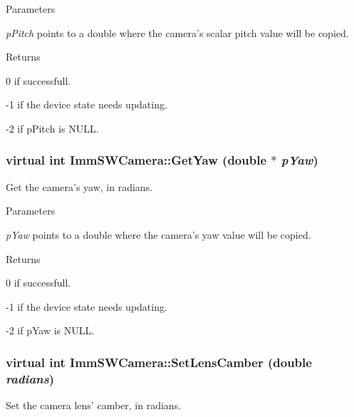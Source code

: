 \begin{DoxyParams}{Parameters}
\item[{\em pPitch}]points to a double where the camera's scalar pitch value will be copied.\end{DoxyParams}
\begin{DoxyReturn}{Returns}

\end{DoxyReturn}
0 if successfull.

-\/1 if the device state needs updating.

-\/2 if pPitch is NULL. \hypertarget{classImmSWCamera_aa6225ae94cf2f697a563a96cc66be588}{
\subsubsection[{GetYaw}]{\setlength{\rightskip}{0pt plus 5cm}virtual int ImmSWCamera::GetYaw (double $\ast$ {\em pYaw})}}
\label{classImmSWCamera_aa6225ae94cf2f697a563a96cc66be588}
Get the camera's yaw, in radians.


\begin{DoxyParams}{Parameters}
\item[{\em pYaw}]points to a double where the camera's yaw value will be copied.\end{DoxyParams}
\begin{DoxyReturn}{Returns}

\end{DoxyReturn}
0 if successfull.

-\/1 if the device state needs updating.

-\/2 if pYaw is NULL. \hypertarget{classImmSWCamera_a05587ccc045713d87234f0ea1395589a}{
\subsubsection[{SetLensCamber}]{\setlength{\rightskip}{0pt plus 5cm}virtual int ImmSWCamera::SetLensCamber (double {\em radians})}}
\label{classImmSWCamera_a05587ccc045713d87234f0ea1395589a}
Set the camera lens' camber, in radians.


